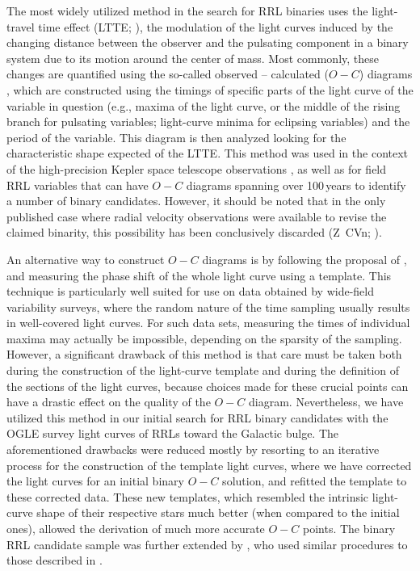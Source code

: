\documentclass[twocolumn,times]{aastex63}
\begin{document}
The most widely utilized method in the search for RRL binaries uses the
light-travel time effect (LTTE; \citealt{1952ApJ...116..211I,1959AJ.....64..149I}), the modulation
of the light curves induced by the changing distance between the observer and the
pulsating component in a binary system due to its motion around the center of mass.
Most commonly, these changes are quantified using the so-called observed -- calculated ($O-C$) diagrams
\citep{2005ASPC..335....3S}, which are constructed using the timings of specific parts of the light curve of the variable in question
(e.g., maxima of the light curve, or the middle of the rising branch for pulsating variables; light-curve
minima for eclipsing variables) and the period of the variable. This diagram is then analyzed looking for the characteristic shape expected
of the LTTE. This method was used in the context of the high-precision Kepler space telescope observations
\citep{2014MNRAS.444..600L,2015EPJWC.10106030G,2017MNRAS.465L...1S}, as well as for field RRL variables that can have $O-C$ diagrams
spanning over 100\,years \citep{2004MNRAS.354..821D,2016MNRAS.459.4360L,2018PASJ...70...71L,2018ApJ...863..151L} to identify a
number of binary candidates. However, it should be noted that in the only published case where radial velocity observations were
available to revise the claimed binarity, this possibility has been conclusively discarded (Z~CVn; \citealt{2018MNRAS.474..824S}).

An alternative way to construct $O-C$ diagrams is by following the proposal of \citet{1919AN....210...17H}, and measuring
the phase shift of the whole light curve using a template. This technique is particularly well suited for use on data
obtained by wide-field variability surveys, where the random nature of the time sampling usually results in well-covered light curves.
For such data sets, measuring the times of individual maxima may actually be impossible, depending on the sparsity of the
sampling. However, a significant drawback of this method is that care must be taken both during the construction of the
light-curve template and during the definition of the sections of the light curves, because choices made for these crucial points
can have a drastic effect on the quality of the $O-C$ diagram.
Nevertheless, we have utilized this method in our initial search for RRL binary candidates \citep{2015MNRAS.449L.113H} with the
OGLE survey light curves \citep{2015AcA....65....1U} of RRLs toward the Galactic bulge.
The aforementioned drawbacks were reduced mostly by resorting to an iterative process for the construction of the
template light curves, where we have corrected the light curves for an initial binary $O-C$ solution, and refitted the template
to these corrected data. These new templates, which resembled the intrinsic light-curve shape of their respective stars
much better (when compared to the initial ones), allowed the derivation of much more accurate $O-C$ points.
The binary RRL candidate sample was further extended by \citet{2019MNRAS.487L...1P}, who used similar procedures to those described in \citet{2015MNRAS.449L.113H}.
\end{document}
